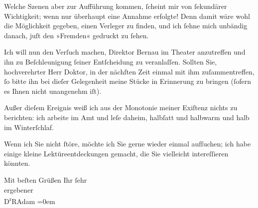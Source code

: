 \pstart
           Welche Szenen aber zur Aufführung kommen, ſcheint mir von ſekundärer Wichtigkeit;
               wenn nur überhaupt eine Annahme erfolgte! Denn damit wäre wohl die Möglichkeit
               gegeben, einen Verleger zu finden, und ich ſehne mich unbändig danach, juſt den »Fremden« gedruckt zu ſehen.\pend
           
\pstart
           Ich will nun den Verſuch machen, Direktor Bernau im Theater anzu{\pb}treffen
               und ihn zu Beſchleunigung ſeiner Entſcheidung zu veranlaſſen. Sollten Sie,
               hochverehrter Herr Doktor, in der nächſten Zeit einmal mit ihm zuſammentreffen, ſo
               bitte ihn bei dieſer Gelegenheit meine Stücke in Erinnerung zu bringen (ſofern es
               Ihnen nicht unangenehm iſt).\pend
           
\pstart
           Außer dieſem Ereignis weiß ich aus der Monotonie meiner Exiſtenz nichts zu berichten:
               ich arbeite im Amt und leſe daheim, halbſatt und halbwarm und halb im
               Winterſchlaf.\pend
           
\pstart
           Wenn ich Sie nicht ſtöre, möchte ich Sie gerne wieder einmal aufſuchen; ich habe
               einige kleine Lektüreentdeckungen gemacht, die Sie vielleicht intereſſieren
               könnten.\pend
           
\pstart
           Mit beſten Grüßen Ihr ſehr{\\[\baselineskip]}ergebener{\\[\baselineskip]}\spacefill\mbox{D\textsuperscript{r}RAdam}\pend
           \leftskip=0em{}\endnumbering{}  
      